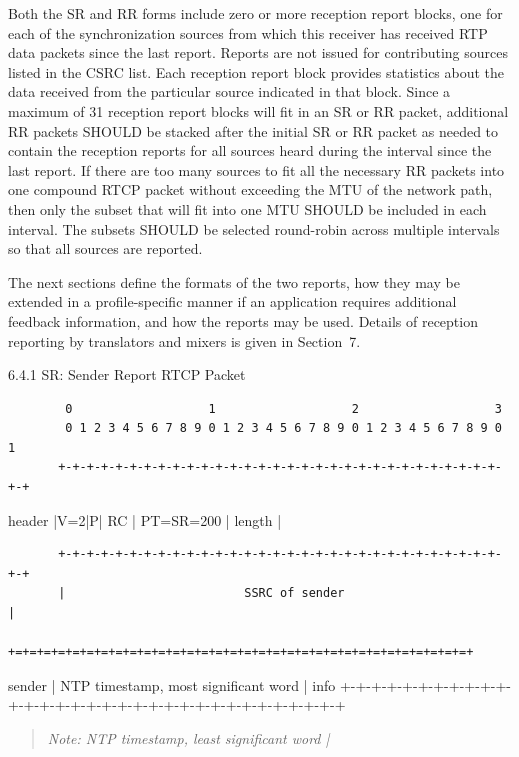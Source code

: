 \documentclass{article}
\begin{document}
Both the SR and RR forms include zero or more reception report blocks, one for each of the synchronization sources from which this receiver has received RTP data packets since the last report. Reports are not issued for contributing sources listed in the CSRC list.  Each reception report block provides statistics about the data received from the particular source indicated in that block.  Since a maximum of 31 reception report blocks will fit in an SR or RR packet, additional RR packets SHOULD be stacked after the initial SR or RR packet as needed to contain the reception reports for all sources heard during the interval since the last report.  If there are too many sources to fit all the necessary RR packets into one compound RTCP packet without exceeding the MTU of the network path, then only the subset that will fit into one MTU SHOULD be included in each interval.  The subsets SHOULD be selected round-robin across multiple intervals so that all sources are reported.

The next sections define the formats of the two reports, how they may be extended in a profile-specific manner if an application requires additional feedback information, and how the reports may be used. Details of reception reporting by translators and mixers is given in Section~7.

6.4.1 SR: Sender Report RTCP Packet

\begin{verbatim}
        0                   1                   2                   3
        0 1 2 3 4 5 6 7 8 9 0 1 2 3 4 5 6 7 8 9 0 1 2 3 4 5 6 7 8 9 0 1
       +-+-+-+-+-+-+-+-+-+-+-+-+-+-+-+-+-+-+-+-+-+-+-+-+-+-+-+-+-+-+-+-+
\end{verbatim}

header |V=2|P|    RC   |   PT=SR=200   |             length            |

\begin{verbatim}
       +-+-+-+-+-+-+-+-+-+-+-+-+-+-+-+-+-+-+-+-+-+-+-+-+-+-+-+-+-+-+-+-+
       |                         SSRC of sender                        |
       +=+=+=+=+=+=+=+=+=+=+=+=+=+=+=+=+=+=+=+=+=+=+=+=+=+=+=+=+=+=+=+=+
\end{verbatim}

sender |              NTP timestamp, most significant word             | info   +-+-+-+-+-+-+-+-+-+-+-+-+-+-+-+-+-+-+-+-+-+-+-+-+-+-+-+-+-+-+-+-+

\begin{quote}
\textit{Note: NTP timestamp, least significant word             |}
\end{quote}
\end{document}
